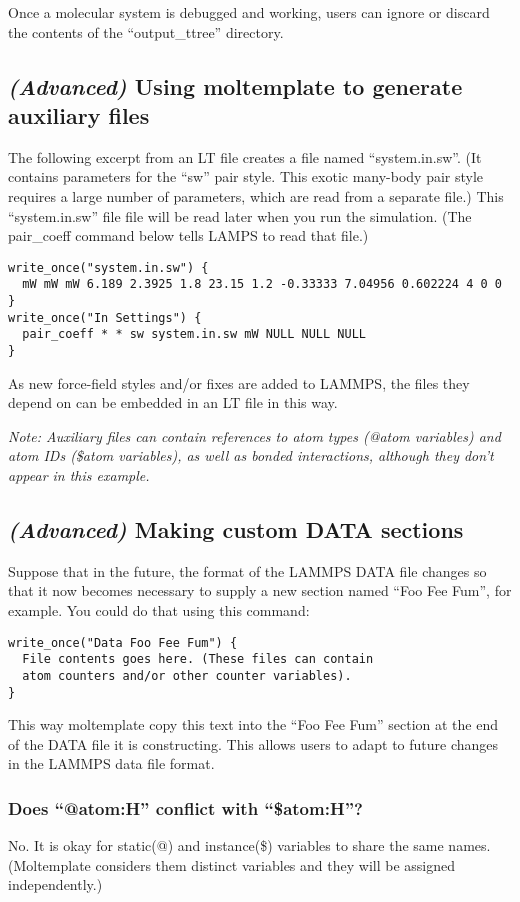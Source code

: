 \documentclass[11pt]{article}
\begin{document}
Once a molecular system is debugged and working, users 
can ignore or discard the contents of the ``output\_ttree'' directory.


\subsection{\textit{(Advanced)} 
               Using moltemplate to generate auxiliary files}
\label{sec:aux_files}
The following excerpt from an LT file 
creates a file named ``system.in.sw''. 
(It contains parameters for the ``sw'' pair style.
 This exotic many-body pair style requires a large number
 of parameters, which are read from a separate file.)
This ``system.in.sw'' file file will be read later when you run the simulation.
(The pair\_coeff command below tells LAMPS to read that file.)
\begin{verbatim}
write_once("system.in.sw") {
  mW mW mW 6.189 2.3925 1.8 23.15 1.2 -0.33333 7.04956 0.602224 4 0 0
}
write_once("In Settings") {
  pair_coeff * * sw system.in.sw mW NULL NULL NULL
}
\end{verbatim}
As new force-field styles and/or fixes are added to LAMMPS, 
the files they depend on can be embedded in an LT file in this way.

\textit{Note: Auxiliary files can contain references to atom types
(@atom variables) and atom IDs (\$atom variables), as well as bonded
interactions, although they don't appear in this example.}


\subsection{\textit{(Advanced)} Making custom DATA sections}
\label{sec:custom_data}
Suppose that in the future, the format of the LAMMPS DATA file changes
so that it now becomes necessary to supply a new section named ``Foo Fee Fum'',
for example.  You could do that using this command:
\begin{verbatim}
write_once("Data Foo Fee Fum") {
  File contents goes here. (These files can contain
  atom counters and/or other counter variables).
}
\end{verbatim}
This way moltemplate copy this text into the ``Foo Fee Fum'' section at
the end of the DATA file it is constructing.
This allows users to adapt to future changes in the LAMMPS data file format.



\subsubsection*{Does ``@atom:H'' conflict with ``\$atom:H''?}
\label{sec:vardetails}
No.  It is okay for static(@) and instance(\$) variables to share the same names.
(Moltemplate considers them distinct variables and they will be assigned independently.)
\end{document}

